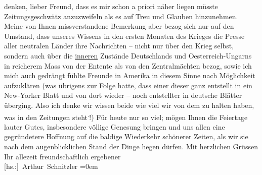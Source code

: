 \begin{ledgroupsized}[t]{13cm}
                    denken, lieber Freund, dass es mir schon a priori näher liegen müsste  Zeitungsgeschwätz anzuzweifeln als es
                    auf Treu und Glauben hinzunehmen. Meine von Ihnen missverstandene Bemerkung aber
                    bezog sich nur auf den Umstand, dass unseres Wissens in den {\pb}ersten Monaten des Krieges die Presse aller
                    neutralen Länder ihre Nachrichten – nicht nur über den Krieg selbst, sondern
                    auch über die \uline{inneren} Zustände Deutschlands und Oesterreich-Ungarns in reicherem Mass von der Entente als von den
                    Zentralmächten bezog, sowie ich mich auch gedrängt fühlte Freunde in Amerika in diesem Sinne nach Möglichkeit aufzuklären (was übrigens zur
                    Folge hatte, dass einer dieser \label{K_L02224_4v}\label{K_L02224_4h} ganz entstellt in ein New-Yorker Blatt und von dort
                    wieder \introOben{}–\introOben{} noch entstellter in deutsche Blätter
                    überging. Also ich denke wir wissen beide wie viel wir von dem zu halten haben,
                    was in den Zeitungen steht\substVorne{}\textsuperscript{.}\substDazwischen{}!\substHinten{}\introOben{})\introOben{}\pend
           \pstart
           Für heute nur so viel; mögen Ihnen die Feiertage lauter Gutes, insbesondere
                    völlige Genesung bringen und uns allen eine gegründetere Hoffnung auf die
                    baldige Wiederkehr schönerer Zeiten, als wir sie nach dem augenblicklichen Stand
                    der Dinge hegen dürfen.\pend
           \pstart
           Mit herzlichen Grüssen{\\[\baselineskip]}Ihr allezeit freundschaftlich ergebener{\\[\baselineskip]}\spacefill\mbox{{[}hs.:{]} Arthur Schnitzler}\pend
           \leftskip=0em{}          \endnumbering{}\end{ledgroupsized}  \newcommand{\dateiname}{L02224}\newcommand{\titel}{Arthur Schnitzler an Georg Brandes, 22. 12. 1915}\newcommand{\editorInnen}{Martin Anton Müller und Gerd-Hermann Susen}
            \footnotesize
\begin{ledgroupsized}[t]{11.5cm}
\end{ledgroupsized}
         
      
